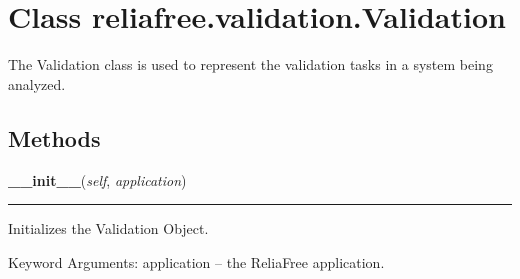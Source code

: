 %
%
%


\section{Class reliafree.validation.Validation}

    \label{reliafree:validation:Validation}
The Validation class is used to represent the validation tasks in a system 
being analyzed.



  \subsection{Methods}

    \label{reliafree:validation:Validation:__init__}

    \vspace{0.5ex}

\hspace{.8\funcindent}\begin{boxedminipage}{\funcwidth}

    \raggedright \textbf{\_\_init\_\_}(\textit{self}, \textit{application})

    \vspace{-1.5ex}

    \rule{\textwidth}{0.5\fboxrule}
\setlength{\parskip}{2ex}
    Initializes the Validation Object.

    Keyword Arguments: application -- the ReliaFree application.

\setlength{\parskip}{1ex}
    \end{boxedminipage}

